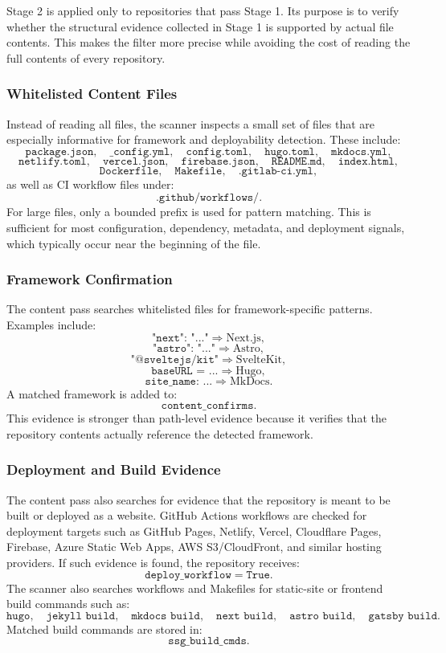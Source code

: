 Stage 2 is applied only to repositories that pass Stage 1. Its purpose is to verify whether the structural evidence collected in Stage 1 is supported by actual file contents. This makes the filter more precise while avoiding the cost of reading the full contents of every repository.

\subsubsection{Whitelisted Content Files}

Instead of reading all files, the scanner inspects a small set of files that are especially informative for framework and deployability detection. These include:
\[
\texttt{package.json},\quad \texttt{\_config.yml},\quad \texttt{config.toml},\quad
\texttt{hugo.toml},\quad \texttt{mkdocs.yml},
\]
\[
\texttt{netlify.toml},\quad \texttt{vercel.json},\quad \texttt{firebase.json},\quad
\texttt{README.md},\quad \texttt{index.html},
\]
\[
\texttt{Dockerfile},\quad \texttt{Makefile},\quad \texttt{.gitlab-ci.yml},
\]
as well as CI workflow files under:
\[
\texttt{.github/workflows/}.
\]
For large files, only a bounded prefix is used for pattern matching. This is sufficient for most configuration, dependency, metadata, and deployment signals, which typically occur near the beginning of the file.

\subsubsection{Framework Confirmation}

The content pass searches whitelisted files for framework-specific patterns. Examples include:
\[
\texttt{"next": "..."} \Rightarrow \text{Next.js},
\]
\[
\texttt{"astro": "..."} \Rightarrow \text{Astro},
\]
\[
\texttt{"@sveltejs/kit"} \Rightarrow \text{SvelteKit},
\]
\[
\texttt{baseURL = ...} \Rightarrow \text{Hugo},
\]
\[
\texttt{site\_name: ...} \Rightarrow \text{MkDocs}.
\]
A matched framework is added to:
\[
\texttt{content\_confirms}.
\]
This evidence is stronger than path-level evidence because it verifies that the repository contents actually reference the detected framework.

\subsubsection{Deployment and Build Evidence}

The content pass also searches for evidence that the repository is meant to be built or deployed as a website. GitHub Actions workflows are checked for deployment targets such as GitHub Pages, Netlify, Vercel, Cloudflare Pages, Firebase, Azure Static Web Apps, AWS S3/CloudFront, and similar hosting providers. If such evidence is found, the repository receives:
\[
\texttt{deploy\_workflow} = \texttt{True}.
\]
The scanner also searches workflows and Makefiles for static-site or frontend build commands such as:
\[
\texttt{hugo},\quad \texttt{jekyll build},\quad \texttt{mkdocs build},\quad
\texttt{next build},\quad \texttt{astro build},\quad \texttt{gatsby build}.
\]
Matched build commands are stored in:
\[
\texttt{ssg\_build\_cmds}.
\]

